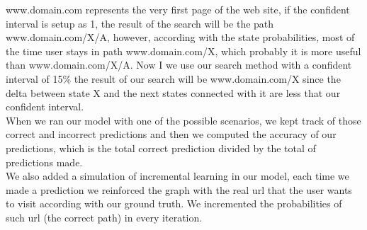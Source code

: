 www.domain.com represents the very first page of the web site, if the confident interval is setup as 1, the result of the search will be the path www.domain.com/X/A, however, according with the state probabilities, most of the time user stays in path www.domain.com/X, which probably it is more useful than www.domain.com/X/A. Now I we use our search method with a confident interval of 15\% the result of our search will be www.domain.com/X since the delta between state X and the next states connected with it are less that our confident interval.
\\[2ex]
When we ran our model with one of the possible scenarios, we kept track of those correct and incorrect predictions and then we computed the accuracy of our predictions, which is the total correct prediction divided by the total of predictions made. 
\\[2ex]
We also added a simulation of incremental learning in our model, each time we made a prediction we reinforced the graph with the real url that the user wants to visit according with our ground truth. We incremented the probabilities of such url (the correct path) in every iteration.
